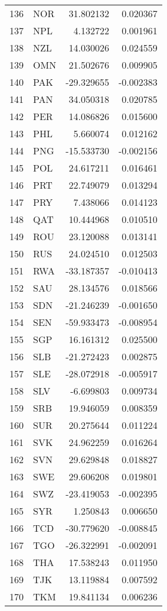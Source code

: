 \begin{tabular}{llrr}
136 & NOR & 31.802132 & 0.020367 \\
137 & NPL & 4.132722 & 0.001961 \\
138 & NZL & 14.030026 & 0.024559 \\
139 & OMN & 21.502676 & 0.009905 \\
140 & PAK & -29.329655 & -0.002383 \\
141 & PAN & 34.050318 & 0.020785 \\
142 & PER & 14.086826 & 0.015600 \\
143 & PHL & 5.660074 & 0.012162 \\
144 & PNG & -15.533730 & -0.002156 \\
145 & POL & 24.617211 & 0.016461 \\
146 & PRT & 22.749079 & 0.013294 \\
147 & PRY & 7.438066 & 0.014123 \\
148 & QAT & 10.444968 & 0.010510 \\
149 & ROU & 23.120088 & 0.013141 \\
150 & RUS & 24.024510 & 0.012503 \\
151 & RWA & -33.187357 & -0.010413 \\
152 & SAU & 28.134576 & 0.018566 \\
153 & SDN & -21.246239 & -0.001650 \\
154 & SEN & -59.933473 & -0.008954 \\
155 & SGP & 16.161312 & 0.025500 \\
156 & SLB & -21.272423 & 0.002875 \\
157 & SLE & -28.072918 & -0.005917 \\
158 & SLV & -6.699803 & 0.009734 \\
159 & SRB & 19.946059 & 0.008359 \\
160 & SUR & 20.275644 & 0.011224 \\
161 & SVK & 24.962259 & 0.016264 \\
162 & SVN & 29.629848 & 0.018827 \\
163 & SWE & 29.606208 & 0.019801 \\
164 & SWZ & -23.419053 & -0.002395 \\
165 & SYR & 1.250843 & 0.006650 \\
166 & TCD & -30.779620 & -0.008845 \\
167 & TGO & -26.322991 & -0.002091 \\
168 & THA & 17.538243 & 0.011950 \\
169 & TJK & 13.119884 & 0.007592 \\
170 & TKM & 19.841134 & 0.006236 \\

\end{tabular}

